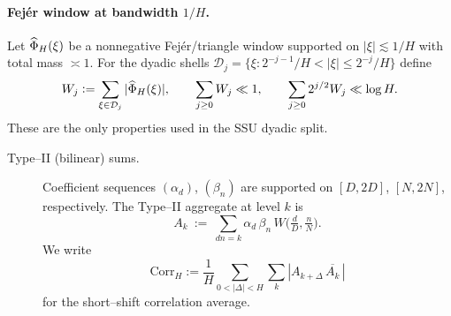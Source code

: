 \paragraph{Fejér window at bandwidth $1/H$.}
Let $\widehat \Phi_H(\xi)$ be a nonnegative Fejér/triangle window supported on $|\xi|\lesssim 1/H$ with total mass $\asymp 1$.
For the dyadic shells $\mathcal D_j=\{\xi:2^{-j-1}/H<|\xi|\le 2^{-j}/H\}$ define
\[
W_j := \sum_{\xi\in \mathcal D_j} |\widehat \Phi_H(\xi)|,\qquad
\sum_{j\ge 0}W_j\ll 1,\qquad \sum_{j\ge 0}2^{j/2}W_j\ll \log H.
\]
These are the only properties used in the SSU dyadic split.


\begin{description}
\item[Type–II (bilinear) sums.]
Coefficient sequences $(\alpha_d)$, $(\beta_n)$ are supported on $[D,2D]$, $[N,2N]$, respectively.  
The Type–II aggregate at level $k$ is
\[
A_k \ :=\ \sum_{dn=k}\alpha_d\,\beta_n\,
W\!\Big(\tfrac dD,\tfrac nN\Big).
\]
We write
\[
\textstyle \mathrm{Corr}_H:=\frac{1}{H}\sum_{0<|\Delta|<H}\sum_k |A_{k+\Delta}\,\overline{A_k}\,|
\]
for the short–shift correlation average.

\end{description}
